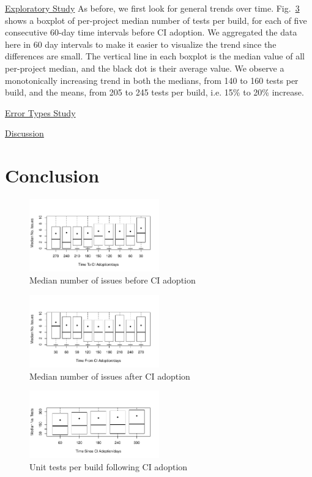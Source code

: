\documentclass[conference]{IEEEtran}
\begin{document}
\noindent \underline{Exploratory Study} As before, we first look for general trends over time.
Fig.~\ref{Fig:Tests} shows a boxplot of per-project median number of tests per build, for each of five consecutive 60-day time intervals before CI adoption.
We aggregated the data here in 60 day intervals to make it easier to visualize the trend since the differences are small.
The vertical line in each boxplot is the median value of all per-project median, and the black dot is their average value.
We observe a monotonically increasing trend in both the medians, from 140 to 160 tests per build, and the means, from 205 to 245 tests per build, i.e. 15\% to 20\% increase. 

\noindent \underline{Error Types Study}

\noindent \underline{Discussion}



\section{Conclusion}

\begin{figure}[!t]
\centering
\includegraphics[width=0.5\textwidth]{issues_before.pdf}
\caption{Median number of issues before CI adoption}
\label{Fig:IssuesBefore}
\end{figure}


\begin{figure}[!t]
\centering
\includegraphics[width=0.5\textwidth]{issues_after.pdf}
\caption{Median number of issues after CI adoption}
\label{Fig:IssuesAfter}
\end{figure}


\begin{figure}[!t]
\centering
\includegraphics[width=0.5\textwidth]{tests.pdf}
\caption{Unit tests per build following CI adoption}
\label{Fig:Tests}
\end{figure}
\end{document}
